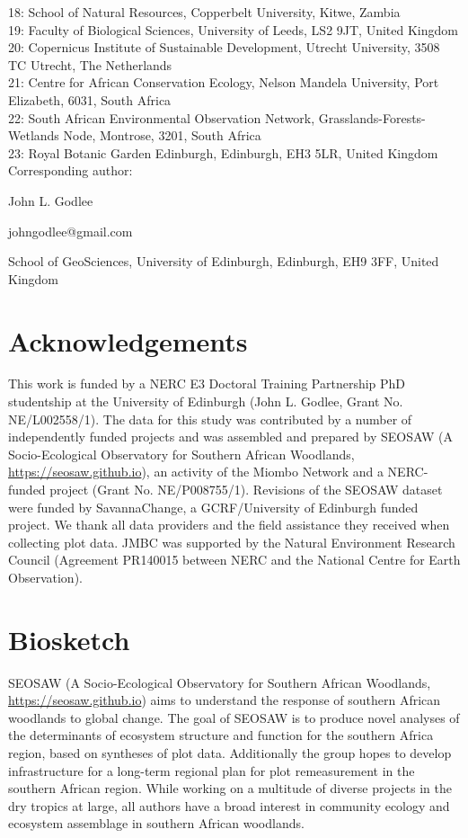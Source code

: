 \documentclass[11pt,a4paper]{article}
\begin{document}
18: School of Natural Resources, Copperbelt University, Kitwe, Zambia \\
19: Faculty of Biological Sciences, University of Leeds, LS2 9JT, United Kingdom\\
20: Copernicus Institute of Sustainable Development, Utrecht University, 3508 TC Utrecht, The Netherlands \\
21: Centre for African Conservation Ecology, Nelson Mandela University, Port Elizabeth, 6031, South Africa \\
22: South African Environmental Observation Network, Grasslands-Forests-Wetlands Node, Montrose, 3201, South Africa \\
23: Royal Botanic Garden Edinburgh, Edinburgh, EH3 5LR, United Kingdom \\

\vspace{1em}
Corresponding author:

John L. Godlee

johngodlee@gmail.com

School of GeoSciences, University of Edinburgh, Edinburgh, EH9 3FF, United Kingdom

\section{Acknowledgements}

This work is funded by a NERC E3 Doctoral Training Partnership PhD studentship at the University of Edinburgh (John L. Godlee, Grant No. NE/L002558/1). The data for this study was contributed by a number of independently funded projects and was assembled and prepared by SEOSAW (A Socio-Ecological Observatory for Southern African Woodlands, \url{https://seosaw.github.io}), an activity of the Miombo Network and a NERC-funded project (Grant No. NE/P008755/1). Revisions of the SEOSAW dataset were funded by SavannaChange, a GCRF/University of Edinburgh funded project. We thank all data providers and the field assistance they received when collecting plot data. JMBC was supported by the Natural Environment Research Council (Agreement PR140015 between NERC and the National Centre for Earth Observation). 

\section{Biosketch}

SEOSAW (A Socio-Ecological Observatory for Southern African Woodlands, \url{https://seosaw.github.io}) aims to understand the response of southern African woodlands to global change. The goal of SEOSAW is to produce novel analyses of the determinants of ecosystem structure and function for the southern Africa region, based on syntheses of plot data. Additionally the group hopes to develop infrastructure for a long-term regional plan for plot remeasurement in the southern African region. While working on a multitude of diverse projects in the dry tropics at large, all authors have a broad interest in community ecology and ecosystem assemblage in southern African woodlands.
\end{document}
